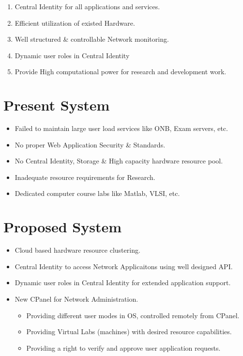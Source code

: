 \documentclass[]{article}
\begin{document}
\begin{enumerate}

\item Central Identity for all applications and services.
\item Efficient utilization of existed Hardware.
\item Well structured \& controllable Network monitoring.
\item Dynamic user roles in Central Identity
\item Provide High computational power for research and development work.

\end{enumerate}

\pagebreak

\section{Present System}
\begin{itemize}
	\item Failed to maintain large user load services like ONB, Exam servers, etc.
	\item No proper Web Application Security \& Standards.
	\item No Central Identity, Storage \& High capacity hardware resource pool.
	\item Inadequate resource requirements for Research.
	\item Dedicated computer course labs like Matlab, VLSI, etc. 
\end{itemize}

\section{Proposed System}
\begin{itemize}
	\item Cloud based hardware resource clustering.
	\item Central Identity to access Network Applicaitons using well designed API.
	\item Dynamic user roles in Central Identity for extended application support.
	\item New CPanel for Network Administration.
		\begin{itemize}
			\item Providing different user modes in OS, controlled remotely from CPanel.
			\item Providing Virtual Labs (machines) with desired resource capabilities.
			\item Providing a right to verify and approve user application requests.
		\end{itemize}
\end{itemize}
\pagebreak
\end{document}
